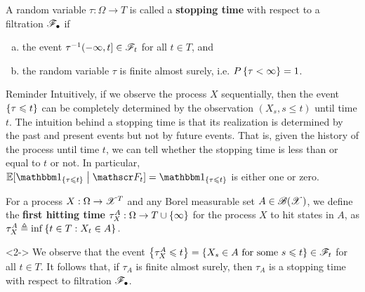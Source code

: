 \documentclass[12pt,aspectratio=169]{beamer}
\begin{document}
\begin{frame}
\begin{Definition}
\label{defn:StoppingTimeGen}
A random variable $\tau: \Omega \to T$ is called a \textbf{stopping time} with respect to  a filtration $\mathscr{F}_\bullet$ if 
\begin{enumerate}[(a)]
\item the event $\tau^{-1}(-\infty, t] \in \mathscr{F}_t$ for all $t \in T$, and 
\item the random variable $\tau$ is finite almost surely, i.e. $P\left\{\tau < \infty\right\} = 1$.  
\end{enumerate}
\end{Definition}
\end{frame}

\begin{frame}
\begin{block}{Reminder}
Intuitively, if we observe the process $X$ sequentially, 
then the event $\left\{\tau \leqslant t\right\}$ can be completely determined by the observation $(X_s, s \le t)$ until time $t$. 
The intuition behind a stopping time is that its realization is determined by the past and present events but not by future events. 
That is, given the history of the process until time $t$, we can tell whether the stopping time is less than or  equal to $t$ or not. 
In particular, $\E[\SetIn{\tau \le t}\given \sF_t]=\SetIn{\tau \le t}$ is either one or zero. 
\end{block}
\end{frame}

\begin{frame}
\begin{Definition}
For a process $X:\Omega\to\mathscr{X}^T$ and any Borel measurable set $A \in \mathscr{B}(\mathscr{X})$, we define the \textbf{first hitting time} $\tau_X^A: \Omega \to T\cup\left\{\infty\right\}$ for the process $X$ to hit states in $A$, as 
$\tau_X^A \triangleq \inf\left\{t \in T: X_t \in A\right\}.$
\end{Definition}

\begin{Example}<2->
We observe that the event $\left\{\tau_X^A \leqslant t\right\} = \left\{X_s \in A \text{ for some }s \leqslant t\right\} \in\mathscr{F}_t$ for all $t \in T$. 
It follows that, if $\tau_A$ is finite almost surely, then $\tau_A$ is a stopping time with respect to filtration $\mathscr{F}_\bullet$.
\end{Example}
\end{frame}
\end{document}
